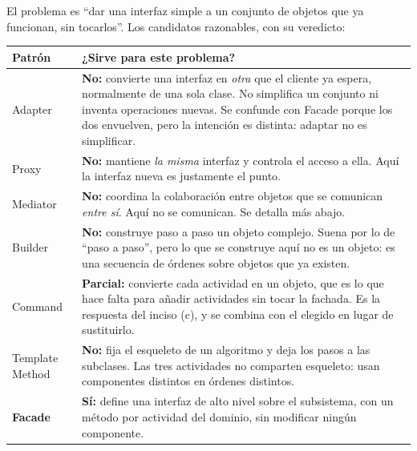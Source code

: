 El problema es ``dar una interfaz simple a un conjunto de objetos que ya funcionan, sin
tocarlos''. Los candidatos razonables, con su veredicto:

\begin{table}[h!]
    \centering
    \small
    \begin{tabular}{p{2.9cm}p{12.1cm}}
        \toprule
        \textbf{Patrón} & \textbf{¿Sirve para este problema?} \\
        \midrule
        Adapter & \textbf{No:} convierte una interfaz en \emph{otra} que el cliente ya
                  espera, normalmente de una sola clase. No simplifica un conjunto ni
                  inventa operaciones nuevas. Se confunde con Facade porque los dos
                  envuelven, pero la intención es distinta: adaptar no es simplificar. \\
        \addlinespace
        Proxy & \textbf{No:} mantiene \emph{la misma} interfaz y controla el acceso a ella.
                Aquí la interfaz nueva es justamente el punto. \\
        \addlinespace
        Mediator & \textbf{No:} coordina la colaboración entre objetos que se comunican
                   \emph{entre sí}. Aquí no se comunican. Se detalla más abajo. \\
        \addlinespace
        Builder & \textbf{No:} construye paso a paso un objeto complejo. Suena por lo de
                  ``paso a paso'', pero lo que se construye aquí no es un objeto: es una
                  secuencia de órdenes sobre objetos que ya existen. \\
        \addlinespace
        Command & \textbf{Parcial:} convierte cada actividad en un objeto, que es lo que
                  hace falta para añadir actividades sin tocar la fachada. Es la respuesta
                  del inciso (c), y se combina con el elegido en lugar de sustituirlo. \\
        \addlinespace
        Template Method & \textbf{No:} fija el esqueleto de un algoritmo y deja los pasos a
                          las subclases. Las tres actividades no comparten esqueleto: usan
                          componentes distintos en órdenes distintos. \\
        \addlinespace
        \textbf{Facade} & \textbf{Sí:} define una interfaz de alto nivel sobre el
                          subsistema, con un método por actividad del dominio, sin modificar
                          ningún componente. \\
        \bottomrule
    \end{tabular}
\end{table}


